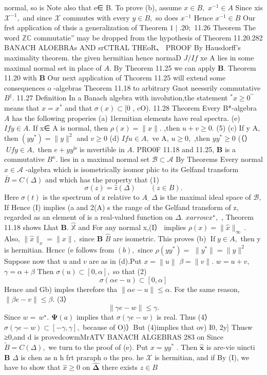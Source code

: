normal, so is Note also that e∈ B. To prove (b), assume $x\in B,$ $x^{-1}\in A$ Since xis ${\mathcal{X}}^{-1},$ and since $\scriptstyle{\mathcal{X}}$ commutes with every $y\in B,$ so does $x^{-1}$ Hence $x^{-1}\in B$ Our frst application of thsis a generalization of Theorem $1\mid.20;$ 11.26 Theorem The word $\mathbb{Z}\mathbb{C}$ commutatie” may be dropped from the hypothesis of Theorem 11.20.282 BANACH ALOEBRAs AND srCTRAL THEoR、 PROOF By Hausdorff's maximality theorem. the given hermitian hence normaD $J/I\!f$ xe A lies in some maximal normal set in place of $A.$ By Theorem 11.25 we can apply ${\boldsymbol{B}}.$ Theorem 11.20 with $\boldsymbol{B}$ Our next application of Thcorem 11.25 will extend some consequences o -algebras Theorem 11.18 to arbitrary Gnot neessrily commutative $B^{\ddagger}.$ 11.27 Definition In a Banach algebra with involution,the statement $^*x\geq0^{\prime\prime}$ means that $x=x^{*}$ and that $\sigma(x)\subset[0$ , cO). 11.28 Theorem Every B*-algebra $\textstyle A$ has the following properies (a) 1lermitian elements have real spectra. (e) $I f y\in A.$ If x∈ A is normal, then $\rho(x)=\|x\|.$ ,then $u+v\geq0.$ (5) (c) If y A, then $(y y^{*})=\|y\|^{2}$ and $v\geq0$ (d) $I f u\in A,$ ve A, $u\geq0,$ ,then $y y^{*}\geq0$ (（） $\;U f y\in A,$ then $e+y y^{\mathrm{is}}$ is mvertible in $A.$ PRO0F 11.18 and 11.25, $\boldsymbol{B}$ is a commutative $B^{\kappa}.$ lies in a maximal normal set ${\mathcal{B}}\subset{\mathcal{A}}$ By Theorems Every normal $x\in{\mathcal{A}}$ -algebra which is isometrically isomor phic to its Gelfand transform ${\bar{B}}=C(\Delta)$ and which has the property that (1) $$ \sigma(z)=\hat{z}(\Delta)\qquad(z\in B). $$ Here $\sigma(t)$ is the spectrum of z relative to $A_{\cdot}$ $\Delta$ is the maximal ideal space of ${\mathcal{B}},$ If Hence (I) implies (a and 2(A) s the range of the Gelfand transform of z, regarded as an element of is a real-valued function on $\Delta.$ $x arrow x^{\star},$ , Theorem 11.18 shows Lhat ${\boldsymbol{B}}.$ $\hat{\mathbb{X}}$ and For any normal x,(I） implies $\rho(x)=\|{\hat{x}}\|_{\infty}\,.$ Also, $\|{\hat{x}}\|_{x}=\|x\|,$ since $\boldsymbol{B}$ $\hat{B}$ are isometric. This proves (b) $\operatorname{If}y\in A,$ then y is hermitian. Hcncc (e follows from $(b),$ since $\rho(y y^{*})=$ $\|y^{\ast}\|=\|y\|^{2}$ Suppose now that u and $\boldsymbol{\mathit{v}}$ are as in (d).Put $x=\left\|u\right\|$ $\beta=\|v\|.$ $w=u+v,$ $\gamma=\alpha+\beta$ Then $\sigma(u)\subset[0,\alpha],$ so that (2) $$ \sigma(\alpha e-u)\subset[0,\alpha] $$ Hence and Gb) imples therefore tha $\|\alpha e-u\|\leq\alpha.$ For the same reason, $\|\beta e-v\|\leq\beta.$ (3） $$ \|\gamma e-w\|\leq\gamma. $$ Since $w=\,w^{\star}.$ $\mathbf{\Psi}(a)$ implies that $\sigma(\gamma e-w)$ is real. Thus (4） $\sigma(\gamma e-w)\subset[-\gamma,\gamma],$ because of O)）But (4)implies that ov) I0, 2y] Thusw ≥0,and d is provedcowmMrATV BANACH ALGEBRAS 283 on Since ${\tilde{B}}=C(\Delta),$ we turn to the proof of (e). Put $x=y y^{*}$ . Then $\hat{\mathbf{x}}$ is are-vie uincti $\boldsymbol{B}$ $\Delta$ is chen as n h frt praraph o ths pro. he $\scriptstyle{\mathcal{X}}$ is hermitian, and if By (I), we have to show that ${\hat{x}}\geq0$ on $\hat{\boldsymbol{\Delta}}$ there exists $z\in B$ 